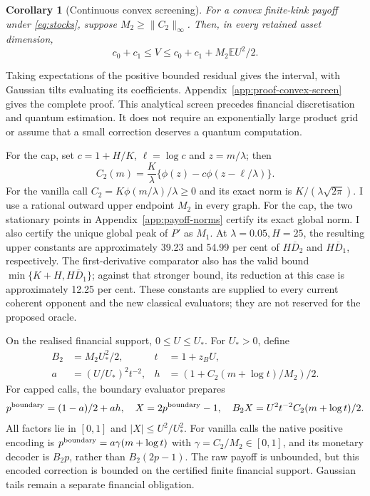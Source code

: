 \documentclass[11pt]{article}
\newtheorem{corollary}[theorem]{Corollary}
\newcommand{\E}{\mathbb E}
\begin{document}
\begin{corollary}[Continuous convex screening]
\label{cor:convex-screen}
For a convex finite-kink payoff under \eqref{eq:stocks}, suppose
$M_2\geq\|C_2\|_\infty$. Then, in every retained asset dimension,
\begin{equation}
 c_0+c_1\leq V\leq c_0+c_1+M_2\E U^2/2.
\end{equation}
\end{corollary}
Taking expectations of the positive bounded residual gives the interval, with Gaussian tilts evaluating its coefficients. Appendix~\ref{app:proof-convex-screen} gives the complete proof.
This analytical screen precedes financial discretisation and quantum
estimation. It does not require an exponentially large product grid or
assume that a small correction deserves a quantum computation.

For the cap, set $c=1+H/K$, $\ell=\log c$ and $z=m/\lambda$; then
\begin{equation}
 C_2(m)=\frac K\lambda\{\phi(z)-c\phi(z-\ell/\lambda)\}.
 \label{eq:cap-curvature}
\end{equation}
For the vanilla call $C_2=K\phi(m/\lambda)/\lambda\geq0$ and its exact
norm is $K/(\lambda\sqrt{2\pi})$. I use a rational outward upper endpoint
$M_2$ in every graph. For the cap, the two stationary points in
Appendix~\ref{app:payoff-norms} certify its exact global norm. I also
certify the unique global peak of $P'$ as $M_1$.
At $\lambda=0.05,H=25$, the resulting upper constants are approximately
39.23 and 54.99 per cent of $H\overline D_2$ and $H\overline D_1$,
respectively. The first-derivative comparator also has the valid bound
$\min\{K+H,H\overline D_1\}$; against that stronger bound, its reduction
at this case is approximately 12.25 per cent. These constants are supplied
to every current coherent opponent and
the new classical evaluators; they are not reserved for the proposed oracle.

On the realised financial support, $0\leq U\leq U_*$.
For $U_*>0$, define
\begin{equation}
 \begin{aligned}
 B_2&=M_2U_*^2/2, &t&=1+z_BU,\\
 a&=(U/U_*)^2t^{-2}, &h&=(1+C_2(m+\log t)/M_2)/2.
 \end{aligned}
 \label{eq:factorised-kernel}
\end{equation}
For capped calls, the boundary evaluator prepares
\begin{equation}
 p^{\rm boundary}=(1-a)/2+ah,\quad X=2p^{\rm boundary}-1,
 \quad B_2X=U^2t^{-2}C_2(m+\log t)/2.
 \label{eq:integral-probability}
\end{equation}
All factors lie in $[0,1]$ and $|X|\leq U^2/U_*^2$.
For vanilla calls the native positive encoding is
$p^{\rm boundary}=a\gamma(m+\log t)$ with
$\gamma=C_2/M_2\in[0,1]$, and its monetary decoder is $B_2p$, rather
than $B_2(2p-1)$. The raw payoff is unbounded, but this encoded correction
is bounded on the certified finite financial support. Gaussian tails
remain a separate financial obligation.
\end{document}
